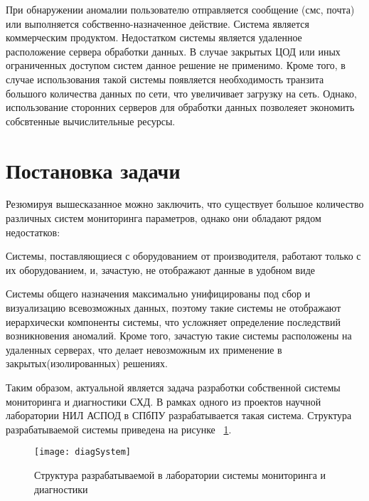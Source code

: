 При обнаружении аномалии пользователю отправляется сообщение (смс, почта) или выполняется собственно-назначенное действие. Система является коммерческим продуктом. Недостатком системы является удаленное расположение сервера обработки данных. В случае закрытых ЦОД или иных ограниченных доступом систем данное решение не применимо. Кроме того, в случае использования такой системы появляется необходимость транзита большого количества данных по сети, что увеличивает загрузку на сеть. Однако, использование сторонних серверов для обработки данных позволеяет экономить собсвтенные вычислительные ресурсы. 

\section{Постановка задачи}

Резюмируя вышесказанное можно заключить, что существует большое количество различных систем мониторинга параметров, однако они обладают рядом недостатков:
\begin{itemize*}
	\item{Системы, поставляющиеся с оборудованием от производителя, работают только с их оборудованием, и, зачастую, не отображают данные в удобном виде}
	\item{Системы общего назначения максимально унифицированы под сбор и визуализацию всевозможных данных, поэтому такие системы не отображают иерархически компоненты системы, что усложняет определение последствий возникновения аномалий.  Кроме того, зачастую такие системы расположены на удаленных серверах, что делает невозможным их применение в закрытых(изолированных) решениях.}
\end{itemize*}

Таким образом, актуальной является задача разработки собственной системы мониторинга и диагностики СХД. В рамках одного из проектов научной лаборатории НИЛ АСПОД в СПбПУ разрабатывается такая система. Структура разрабатываемой системы приведена на рисунке ~\ref{fig:diagSystem}.
\begin{figure}[!h]
	\centering
	\texttt{[image: diagSystem]}
	\caption{Структура разрабатываемой в лаборатории системы мониторинга и диагностики}
	\label{fig:diagSystem}
\end{figure}

